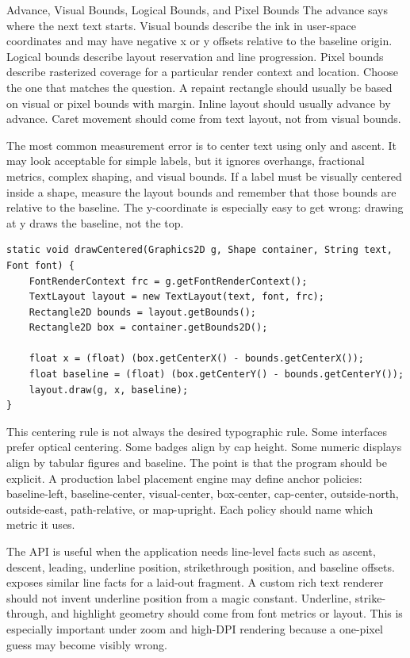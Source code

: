 \begin{detailbox}{Advance, Visual Bounds, Logical Bounds, and Pixel Bounds}
The advance says where the next text starts. Visual bounds describe the ink in user-space coordinates and may have negative x or y offsets relative to the baseline origin. Logical bounds describe layout reservation and line progression. Pixel bounds describe rasterized coverage for a particular render context and location. Choose the one that matches the question. A repaint rectangle should usually be based on visual or pixel bounds with margin. Inline layout should usually advance by advance. Caret movement should come from text layout, not from visual bounds.
\end{detailbox}

The most common measurement error is to center text using only  and ascent. It may look acceptable for simple labels, but it ignores overhangs, fractional metrics, complex shaping, and visual bounds. If a label must be visually centered inside a shape, measure the layout bounds and remember that those bounds are relative to the baseline. The y-coordinate is especially easy to get wrong: drawing at y draws the baseline, not the top.

\begin{lstlisting}[caption={Centering text by visual bounds instead of pretending y is top.}]
static void drawCentered(Graphics2D g, Shape container, String text, Font font) {
    FontRenderContext frc = g.getFontRenderContext();
    TextLayout layout = new TextLayout(text, font, frc);
    Rectangle2D bounds = layout.getBounds();
    Rectangle2D box = container.getBounds2D();

    float x = (float) (box.getCenterX() - bounds.getCenterX());
    float baseline = (float) (box.getCenterY() - bounds.getCenterY());
    layout.draw(g, x, baseline);
}
\end{lstlisting}

This centering rule is not always the desired typographic rule. Some interfaces prefer optical centering. Some badges align by cap height. Some numeric displays align by tabular figures and baseline. The point is that the program should be explicit. A production label placement engine may define anchor policies: baseline-left, baseline-center, visual-center, box-center, cap-center, outside-north, outside-east, path-relative, or map-upright. Each policy should name which metric it uses.

The  API is useful when the application needs line-level facts such as ascent, descent, leading, underline position, strikethrough position, and baseline offsets.  exposes similar line facts for a laid-out fragment. A custom rich text renderer should not invent underline position from a magic constant. Underline, strike-through, and highlight geometry should come from font metrics or layout. This is especially important under zoom and high-DPI rendering because a one-pixel guess may become visibly wrong.

